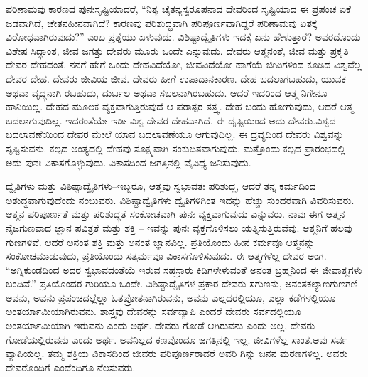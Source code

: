 ಪರಿಣಾಮವು ಕಾರಣದ ಪುನಃಸೃಷ್ಟಿಯಾದರೆ, “ನಿತ್ಯ ಚೈತನ್ಯಸ್ವರೂಪನಾದ ದೇವರಿಂದ ಸೃಷ್ಟಿಯಾದ ಈ ಪ್ರಪಂಚ ಏಕೆ ಜಡವಾಗಿದೆ, ಚೇತನಹೀನವಾಗಿದೆ? ಕಾರಣವು ಪರಿಶುದ್ಧವಾಗಿ ಪರಿಪೂರ್ಣವಾಗಿದ್ದರೆ ಪರಿಣಾಮವು ಏತಕ್ಕೆ ವಿರೋಧವಾಗಿರುವುದು?” ಎಂಬ ಪ್ರಶ್ನೆಯು ಏಳುವುದು. ವಿಶಿಷ್ಟಾದ್ವೈತಿಗಳು ಇದಕ್ಕೆ ಏನು ಹೇಳುತ್ತಾರೆ? ಅವರದೊಂದು ವಿಶೇಷ ಸಿದ್ಧಾಂತ, ಜೀವ ಜಗತ್ತು ದೇವರು ಮೂರು ಒಂದೇ ಎನ್ನುವುದು. ದೇವರು ಆತ್ಮನಂತೆ, ಜೀವ ಮತ್ತು ಪ್ರಕೃತಿ ದೇವರ ದೇಹದಂತೆ. ನನಗೆ ಹೇಗೆ ಒಂದು ದೇಹವಿದೆಯೋ, ಜೀವವಿದೆಯೋ ಹಾಗೆಯೆ ಜೀವಿಗಳಿಂದ ಕೂಡಿದ ವಿಶ್ವವೆಲ್ಲ ದೇವರ ದೇಹ. ದೇವರು ಜೀವಿಯ ಜೀವ. ದೇವರು ಹೀಗೆ ಉಪಾದಾನಕಾರಣ. ದೇಹ ಬದಲಾಗಬಹುದು, ಯುವಕ ಅಥವಾ ವೃದ್ಧನಾಗಿ ರಬಹುದು, ದುರ್ಬಲ ಅಥವಾ ಸಬಲನಾಗಿರಬಹುದು. ಆದರೆ ಇದರಿಂದ ಆತ್ಮ ನಿಗೇನೂ ಹಾನಿಯಿಲ್ಲ. ದೇಹದ ಮೂಲಕ ವ್ಯಕ್ತವಾಗುತ್ತಿರುವುದೆ ಆ ಪರಾತ್ಪರ ತತ್ತ್ವ. ದೇಹ ಬಂದು ಹೋಗುವುದು, ಆದರೆ ಆತ್ಮ ಬದಲಾಗುವುದಿಲ್ಲ. ಇದರಂತೆಯೇ ಇಡೀ ವಿಶ್ವ ದೇವರ ದೇಹವಾಗಿದೆ. ಈ ದೃಷ್ಟಿಯಿಂದ ಅದು ದೇವರು.ವಿಶ್ವದ ಬದಲಾವಣೆಯಿಂದ ದೇವರ ಮೇಲೆ ಯಾವ ಬದಲಾವಣೆಯೂ ಆಗುವುದಿಲ್ಲ. ಈ ದ್ರವ್ಯದಿಂದ ದೇವರು ವಿಶ್ವವನ್ನು ಸೃಷ್ಟಿಸುವನು. ಕಲ್ಪದ ಅಂತ್ಯದಲ್ಲಿ ದೇಹವು ಸೂಕ್ಷ್ಮವಾಗಿ ಸಂಕುಚಿತವಾಗುವುದು. ಮತ್ತೊಂದು ಕಲ್ಪದ ಪ್ರಾರಂಭದಲ್ಲಿ ಅದು ಪುನಃ ವಿಕಾಸಗೊಳ್ಳುವುದು. ವಿಕಾಸದಿಂದ ಜಗತ್ತಿನಲ್ಲಿ ವೈವಿಧ್ಯ ಜನಿಸುವುದು.

ದ್ವೈತಿಗಳು ಮತ್ತು ವಿಶಿಷ್ಟಾದ್ವೈತಿಗಳು–ಇಬ್ಬರೂ, ಆತ್ಮವು ಸ್ವಭಾವತಃ ಪರಿಶುದ್ಧ, ಆದರೆ ತನ್ನ ಕರ್ಮದಿಂದ ಅಶುದ್ಧವಾಗುವುದೆಂದು ನಂಬುವರು. ವಿಶಿಷ್ಟಾದ್ವೈತಿಗಳು ದ್ವೈತಿಗಳಿಗಿಂತ ಇದನ್ನು ಹೆಚ್ಚು ಸುಂದರವಾಗಿ ವಿವರಿಸುವರು. ಆತ್ಮನ ಪರಿಪೂರ್ಣತೆ ಮತ್ತು ಪರಿಶುದ್ಧತೆ ಸಂಕೋಚವಾಗಿ ಪುನಃ ವ್ಯಕ್ತವಾಗುವುದು ಎನ್ನುವರು. ನಾವು ಈಗ ಆತ್ಮನ ನೈಜಗುಣವಾದ ಜ್ಞಾನ ಪವಿತ್ರತೆ ಮತ್ತು ಶಕ್ತಿ – ಇವನ್ನು ಪುನಃ ವ್ಯಕ್ತಗೊಳಿಸಲು ಯತ್ನಿಸುತ್ತಿರುವೆವು. ಆತ್ಮನಿಗೆ ಹಲವು ಗುಣಗಳಿವೆ. ಆದರೆ ಅನಂತ ಶಕ್ತಿ ಮತ್ತು ಅನಂತ ಜ್ಞಾನವಿಲ್ಲ. ಪ್ರತಿಯೊಂದು ಹೀನ ಕರ್ಮವೂ ಆತ್ಮನನ್ನು ಸಂಕೋಚಮಾಡುವುದು, ಪ್ರತಿಯೊಂದು ಸತ್ಕರ್ಮವೂ ವಿಕಾಸಗೊಳಿಸುವುದು. ಈ ಆತ್ಮಗಳೆಲ್ಲ ದೇವರ ಅಂಗ. “ಅಗ್ನಿಕುಂಡದಿಂದ ಅದರ ಸ್ವಭಾವದಂತೆಯೆ ಇರುವ ಸಹಸ್ರಾರು ಕಿಡಿಗಳೇಳುವಂತೆ ಅನಂತ ಬ್ರಹ್ಮನಿಂದ ಈ ಜೀವಾತ್ಮಗಳು ಬಂದಿವೆ.” ಪ್ರತಿಯೊಂದರ ಗುರಿಯೂ ಒಂದೇ. ವಿಶಿಷ್ಟಾದ್ವೈತಿಗಳ ಪ್ರಕಾರ ದೇವರು ಸಗುಣನು, ಅನಂತಕಲ್ಯಾಣಗುಣಗಣಿ ಅವನು, ಅವನು ಪ್ರಪಂಚದಲ್ಲೆಲ್ಲಾ ಓತಪ್ರೋತನಾಗಿರುವನು, ಅವನು ಎಲ್ಲದರಲ್ಲಿಯೂ, ಎಲ್ಲಾ ಕಡೆಗಳಲ್ಲಿಯೂ ಅಂತರ್ಯಾಮಿಯಾಗಿರುವನು. ಶಾಸ್ತ್ರವು ದೇವರನ್ನು ಸರ್ವವ್ಯಾಪಿ ಎಂದರೆ ದೇವರು ಸರ್ವದಲ್ಲಿಯೂ ಅಂತರ್ಯಾಮಿಯಾಗಿ ಇರುವನು ಎಂದು ಅರ್ಥ. ದೇವರು ಗೋಡೆ ಆಗಿರುವನು ಎಂದು ಅಲ್ಲ, ದೇವರು ಗೋಡೆಯಲ್ಲಿರುವನು ಎಂದು ಅರ್ಥ. ಅವನಿಲ್ಲದ ಕಣವೊಂದೂ ಜಗತ್ತಿನಲ್ಲಿ ಇಲ್ಲ. ಜೀವಿಗಳೆಲ್ಲ ಸಾಂತ.ಅವು ಸರ್ವ ವ್ಯಾಪಿಯಲ್ಲ. ತಮ್ಮ ಶಕ್ತಿಯ ವಿಕಾಸದಿಂದ ಜೀವರು ಪರಿಪೂರ್ಣರಾದರೆ ಅವರಿ ಗಿನ್ನು ಜನನ ಮರಣಗಳಿಲ್ಲ. ಅವರು ದೇವರೊಂದಿಗೆ ಎಂದೆಂದಿಗೂ ನೆಲಸುವರು.

